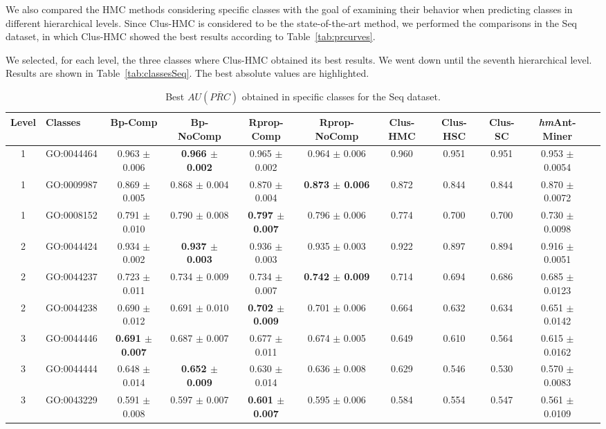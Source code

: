 We also compared the HMC methods considering specific classes with the goal of examining their behavior when predicting classes in different hierarchical levels. Since Clus-HMC is considered to be the state-of-the-art method, we performed the comparisons in the Seq dataset, in which Clus-HMC showed the best results according to Table~\ref{tab:prcurves}.

We selected, for each level, the three classes where Clus-HMC obtained its best results. We went down until the seventh hierarchical level. Results are shown in Table~\ref{tab:classesSeq}. The best absolute values are highlighted.

\begin{table*}[ht]
\scriptsize
\centering
\setlength{\tabcolsep}{3pt}
\caption{Best $AU(\overline{PRC})$ obtained in specific classes for the Seq dataset.}
\begin{tabular*}{\textwidth}
    {@{\extracolsep{\fill}}clccccccccc}
\toprule
Level & Classes  & Bp-Comp & Bp-NoComp & Rprop-Comp & Rprop-NoComp & Clus-HMC & Clus-HSC & Clus-SC & {\it hm}Ant-Miner  \\
 \midrule
1 & GO:0044464  & 0.963 $\pm$ 0.006 & {\bf 0.966 $\pm$ 0.002} & 0.965 $\pm$ 0.002 & 0.964 $\pm$ 0.006 & 0.960 & 0.951 & 0.951 & 0.953 $\pm$ 0.0054 \\
1 & GO:0009987  & 0.869 $\pm$ 0.005 & 0.868 $\pm$ 0.004 & 0.870 $\pm$ 0.004 & {\bf 0.873 $\pm$ 0.006} & 0.872 & 0.844 & 0.844 & 0.870 $\pm$ 0.0072 \\
1 & GO:0008152  & 0.791 $\pm$ 0.010 & 0.790 $\pm$ 0.008 & {\bf 0.797 $\pm$ 0.007} & 0.796 $\pm$ 0.006 & 0.774 & 0.700 & 0.700 & 0.730 $\pm$ 0.0098 \\

2 & GO:0044424  & 0.934 $\pm$ 0.002 & {\bf 0.937 $\pm$ 0.003} & 0.936 $\pm$ 0.003 & 0.935 $\pm$ 0.003 & 0.922 & 0.897 & 0.894 & 0.916 $\pm$ 0.0051 \\
2 & GO:0044237  & 0.723 $\pm$ 0.011 & 0.734 $\pm$ 0.009 & 0.734 $\pm$ 0.007 & {\bf 0.742 $\pm$ 0.009} & 0.714 & 0.694 & 0.686 & 0.685 $\pm$ 0.0123 \\
2 & GO:0044238  & 0.690 $\pm$ 0.012 & 0.691 $\pm$ 0.010 & {\bf 0.702 $\pm$ 0.009} & 0.701 $\pm$ 0.006 & 0.664 & 0.632 & 0.634 & 0.651 $\pm$ 0.0142 \\

3 & GO:0044446  & {\bf 0.691 $\pm$ 0.007} & 0.687 $\pm$ 0.007 & 0.677 $\pm$ 0.011 & 0.674 $\pm$ 0.005 & 0.649 & 0.610 & 0.564 & 0.615 $\pm$ 0.0162 \\
3 & GO:0044444  & 0.648 $\pm$ 0.014 & {\bf 0.652 $\pm$ 0.009} & 0.630 $\pm$ 0.014 & 0.636 $\pm$ 0.008 & 0.629 & 0.546 & 0.530 & 0.570 $\pm$ 0.0083 \\
3 & GO:0043229  & 0.591 $\pm$ 0.008 & 0.597 $\pm$ 0.007 & {\bf 0.601 $\pm$ 0.007} & 0.595 $\pm$ 0.006 & 0.584 & 0.554 & 0.547 & 0.561 $\pm$ 0.0109 \\


\end{tabular*}
\end{table*}
